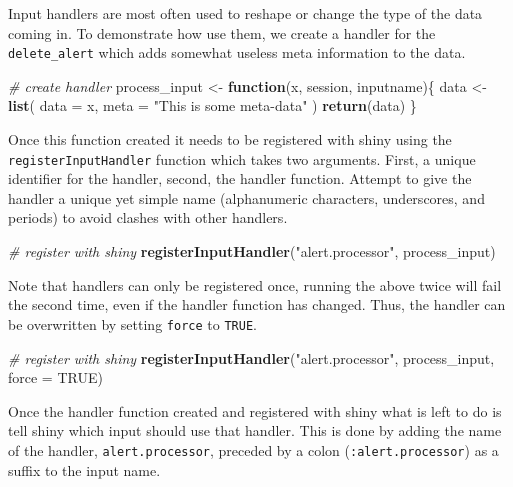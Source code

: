 \documentclass[
]{krantz}
\makeatletter
\newenvironment{Shaded}{\begin{snugshade}}{\end{snugshade}}
\newcommand{\CommentTok}[1]{\textcolor[rgb]{0.37,0.37,0.37}{\textit{#1}}}
\newcommand{\ControlFlowTok}[1]{\textcolor[rgb]{0.27,0.27,0.27}{\textbf{#1}}}
\newcommand{\DataTypeTok}[1]{\textcolor[rgb]{0.27,0.27,0.27}{#1}}
\newcommand{\KeywordTok}[1]{\textcolor[rgb]{0.27,0.27,0.27}{\textbf{#1}}}
\newcommand{\NormalTok}[1]{#1}
\newcommand{\OtherTok}[1]{\textcolor[rgb]{0.37,0.37,0.37}{#1}}
\newcommand{\StringTok}[1]{\textcolor[rgb]{0.5,0.5,0.5}{#1}}
\newenvironment{kframe}{%
\medskip{}
\setlength{\fboxsep}{.8em}
 \def\at@end@of@kframe{}%
 \ifinner\ifhmode%
  \def\at@end@of@kframe{\end{minipage}}%
  \begin{minipage}{\columnwidth}%
 \fi\fi%
 \def\FrameCommand##1{\hskip\@totalleftmargin \hskip-\fboxsep
 \colorbox{shadecolor}{##1}\hskip-\fboxsep
     \hskip-\linewidth \hskip-\@totalleftmargin \hskip\columnwidth}%
 \MakeFramed {\advance\hsize-\width
   \@totalleftmargin\z@ \linewidth\hsize
   \@setminipage}}%
 {\par\unskip\endMakeFramed%
 \at@end@of@kframe}
\renewenvironment{Shaded}{\begin{kframe}}{\end{kframe}}
\makeatother
\begin{document}
Input handlers are most often used to reshape or change the type of the data coming in. To demonstrate how use them, we create a handler for the \texttt{delete\_alert} which adds somewhat useless meta information to the data.

\begin{Shaded}
\begin{Highlighting}[]
\CommentTok{\# create handler}
\NormalTok{process\_input <{-}}\StringTok{ }\ControlFlowTok{function}\NormalTok{(x, session, inputname)\{}
\NormalTok{  data <{-}}\StringTok{ }\KeywordTok{list}\NormalTok{(}
    \DataTypeTok{data =}\NormalTok{ x,}
    \DataTypeTok{meta =} \StringTok{"This is some meta{-}data"}
\NormalTok{  )}
  \KeywordTok{return}\NormalTok{(data)}
\NormalTok{\}}
\end{Highlighting}
\end{Shaded}

Once this function created it needs to be registered with shiny using the \texttt{registerInputHandler} function which takes two arguments. First, a unique identifier for the handler, second, the handler function. Attempt to give the handler a unique yet simple name (alphanumeric characters, underscores, and periods) to avoid clashes with other handlers.

\begin{Shaded}
\begin{Highlighting}[]
\CommentTok{\# register with shiny}
\KeywordTok{registerInputHandler}\NormalTok{(}\StringTok{"alert.processor"}\NormalTok{, process\_input)}
\end{Highlighting}
\end{Shaded}

Note that handlers can only be registered once, running the above twice will fail the second time, even if the handler function has changed. Thus, the handler can be overwritten by setting \texttt{force} to \texttt{TRUE}.

\begin{Shaded}
\begin{Highlighting}[]
\CommentTok{\# register with shiny}
\KeywordTok{registerInputHandler}\NormalTok{(}\StringTok{"alert.processor"}\NormalTok{, process\_input, }\DataTypeTok{force =} \OtherTok{TRUE}\NormalTok{)}
\end{Highlighting}
\end{Shaded}

Once the handler function created and registered with shiny what is left to do is tell shiny which input should use that handler. This is done by adding the name of the handler, \texttt{alert.processor}, preceded by a colon (\texttt{:alert.processor}) as a suffix to the input name.
\end{document}

